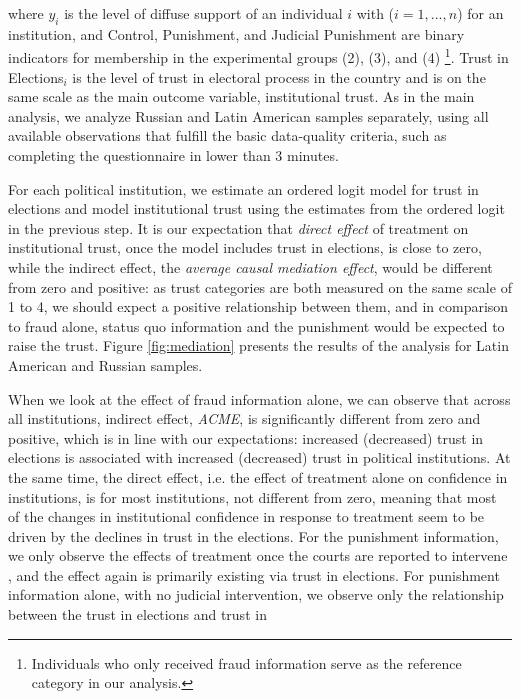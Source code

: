 \documentclass[11pt, ngerman,english,a4]{article}
\begin{document}
\noindent where $y_i$ is the level of diffuse support of an individual $i$ with ($i=1,...,n$) for an institution, and Control, Punishment, and Judicial Punishment are binary indicators for membership in the experimental groups (2),  (3), and (4) \footnote{Individuals who only received fraud information serve as the reference category in our analysis.}. Trust in Elections$_i$ is the level of trust in electoral process in the country and is on the same scale as the main outcome variable, institutional trust. As in the main analysis, we analyze Russian and Latin American samples separately, using all available observations that fulfill the basic data-quality criteria, such as completing the questionnaire in lower than 3 minutes.
    
For each political institution, we estimate an ordered logit model for trust in elections and model institutional trust using the estimates from the ordered logit in the previous step. It is our expectation that \textit{direct effect} of treatment on institutional trust, once the model includes trust in elections, is close to zero, while the indirect effect, the \textit{average causal mediation effect}, would be different from zero and positive: as trust categories are both measured on the same scale of 1 to 4, we should expect a positive relationship between them, and in comparison to fraud alone, status quo information and the punishment would be expected to raise the trust. Figure \ref{fig:mediation} presents the results of the analysis for Latin American and Russian samples. 

When we look at the effect of fraud information alone, we can observe that across all institutions, indirect effect, \textit{ACME}, is significantly different from zero and positive, which is in line with our expectations: increased (decreased) trust in elections is associated with increased (decreased) trust in political institutions. At the same time, the direct effect, i.e. the effect of treatment alone on confidence in institutions, is for most institutions, not different from zero, meaning that most of the changes in institutional confidence in response to treatment seem to be driven by the declines in trust in the elections. For the punishment information, we only observe the effects of treatment once the courts are reported to intervene , and the effect again is primarily existing via trust in elections. For punishment information alone, with no judicial intervention, we observe only the relationship between the trust in elections and trust in 
\end{document}
